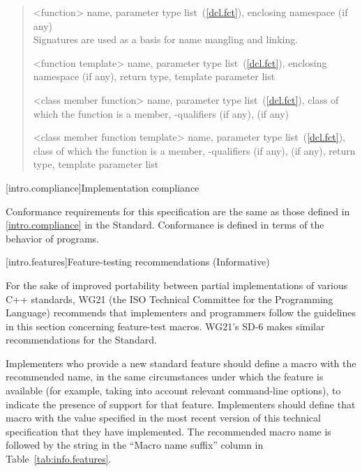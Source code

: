 \begin{quote}
%
<function> name, parameter type list~(\ref{dcl.fct}),  enclosing 
namespace (if any)\\
\enternote Signatures are used as a basis for
name mangling and linking.\exitnote

%
<function template> name, parameter type list~(\ref{dcl.fct}), enclosing namespace (if any),
return type,  template parameter list

%
<class member function> name, parameter type list~(\ref{dcl.fct}), class of which the
function is a member, \cv-qualifiers (if any),
  (if any)

%
<class member function template> name, parameter type list~(\ref{dcl.fct}), class of which the
function is a member, \cv-qualifiers (if any),
 (if any), return type,  template 
parameter list
\end{quote}

[intro.compliance]{Implementation compliance}

\pnum
Conformance requirements for this specification are the same as those 
defined in \ref{intro.compliance} in the \Cpp Standard.
\enternote 
Conformance is defined in terms of the behavior of programs.
\exitnote

[intro.features]{Feature-testing recommendations (Informative)}

\pnum
For the sake of improved portability between partial implementations of various
C++ standards, WG21 (the ISO Technical Committee for the \Cpp Programming
Language) recommends that implementers and programmers follow the guidelines in
this section concerning feature-test macros. 
\enternote 
WG21's SD-6 makes similar recommendations for the \Cpp Standard.
\exitnote

\pnum
Implementers who provide a new standard feature should define a macro with the
recommended name, in the same circumstances under which the feature is available
(for example, taking into account relevant command-line options), to indicate
the presence of support for that feature. Implementers should define that macro
with the value specified in the most recent version of this technical
specification that they have implemented. The recommended macro name is
 followed by the string in the ``Macro name suffix''
column in Table~\ref{tab:info.features}.

